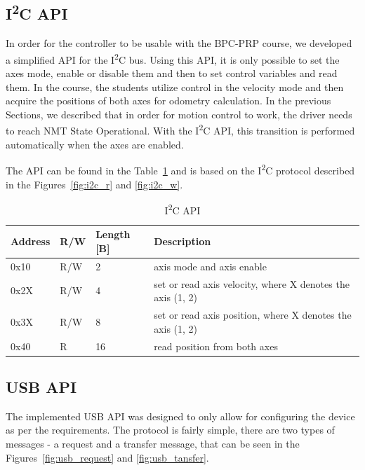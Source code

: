 \subsection{I\textsuperscript{2}C API}
In order for the controller to be usable with the BPC-PRP course, we developed a simplified API for the I\textsuperscript{2}C bus.
Using this API, it is only possible to set the axes mode, enable or disable them and then to set control variables and read them.
In the course, the students utilize control in the velocity mode and then acquire the positions of both axes for odometry calculation.
In the previous Sections, we described that in order for motion control to work, the driver needs to reach NMT State Operational.
With the I\textsuperscript{2}C API, this transition is performed automatically when the axes are enabled.

The API can be found in the Table~\ref{tab:i2c_api} and is based on the I\textsuperscript{2}C protocol described in the Figures~\ref{fig:i2c_r} and \ref{fig:i2c_w}.

\begin{table}[H]
    \centering
    \begin{tabular}{ |p{3cm}|p{2cm}|p{2cm}|p{6cm}| }
        \hline
        Address & R/W & Length [B] & Description \\
        \hline
        \hline
        0x10 & R/W & 2 & axis mode and axis enable \\
        \hline
        0x2X & R/W & 4 & set or read axis velocity, where X denotes the axis (1, 2) \\
        \hline
        0x3X & R/W & 8 & set or read axis position, where X denotes the axis (1, 2) \\
        \hline
        0x40 & R & 16 & read position from both axes \\
        \hline
    \end{tabular}
    \caption{I\textsuperscript{2}C API}
    \label{tab:i2c_api}
\end{table}

\subsection{USB API}
The implemented USB API was designed to only allow for configuring the device as per the requirements.
The protocol is fairly simple, there are two types of messages - a request and a transfer message, that can be seen in the Figures~\ref{fig:usb_request} and \ref{fig:usb_tansfer}.

